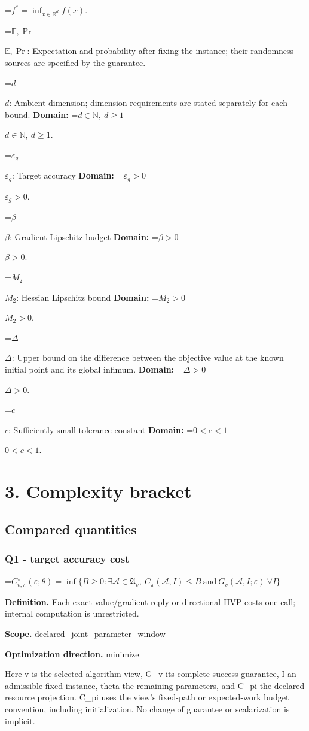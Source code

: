 \documentclass[10pt,a4paper]{article}
\newcommand{\AtlasMath}[1]{\par\begingroup\centering\setbox0=\hbox{$\displaystyle #1$}\ifdim\wd0>1.4\linewidth\typeout{ATLAS WIDE FORMULA: \the\wd0}\fi\ifdim\wd0>\linewidth\resizebox{\linewidth}{!}{\box0}\else\box0\fi\par\endgroup}
\newcommand{\AtlasInlineMath}[1]{\begingroup\setbox0=\hbox{$#1$}\ifdim\wd0>.4\linewidth\endgroup\AtlasMath{#1}\else\endgroup$#1$\fi}
\begin{document}
\AtlasMath{f^*=\inf_{x\in \mathbb{R}^d}f(x).}


\AtlasInlineMath{\mathbb{E},\Pr}: Expectation and probability after fixing the instance; their randomness sources are specified by the guarantee.

\AtlasInlineMath{d}: Ambient dimension; dimension requirements are stated separately for each bound. \textbf{Domain:} \AtlasInlineMath{d\in\mathbb{N},\ d\ge1}.

\AtlasInlineMath{\varepsilon_g}: Target accuracy \textbf{Domain:} \AtlasInlineMath{\varepsilon_g>0}.

\AtlasInlineMath{\beta}: Gradient Lipschitz budget \textbf{Domain:} \AtlasInlineMath{\beta>0}.

\AtlasInlineMath{M_2}: Hessian Lipschitz bound \textbf{Domain:} \AtlasInlineMath{M_2>0}.

\AtlasInlineMath{\Delta}: Upper bound on the difference between the objective value at the known initial point and its global infimum. \textbf{Domain:} \AtlasInlineMath{\Delta>0}.

\AtlasInlineMath{c}: Sufficiently small tolerance constant \textbf{Domain:} \AtlasInlineMath{0<c<1}.

\section{3. Complexity bracket}
\subsection{Compared quantities}
\subsubsection{Q1 - target accuracy cost}
\AtlasMath{C^\star_{v,\pi}(\varepsilon;\theta)=\inf\{B\ge0:\exists\mathcal A\in\mathfrak A_v,\ C_\pi(\mathcal A,I)\le B\ \text{and}\ G_v(\mathcal A,I;\varepsilon)\ \forall I\}}
\textbf{Definition.} Each exact value/gradient reply or directional HVP costs one call; internal computation is unrestricted.

\textbf{Scope.} declared\_joint\_parameter\_window

\textbf{Optimization direction.} minimize

Here v is the selected algorithm view, G\_v its complete success guarantee, I an admissible fixed instance, theta the remaining parameters, and C\_pi the declared resource projection. C\_pi uses the view's fixed-path or expected-work budget convention, including initialization. No change of guarantee or scalarization is implicit.
\end{document}
